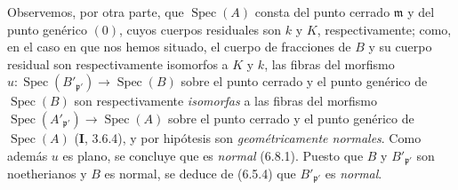 Observemos, por otra parte, que $\operatorname{Spec}(A)$ consta del
punto cerrado $\mathfrak m$ y del punto genérico $(0)$, cuyos cuerpos
residuales son $k$ y $K$, respectivamente; como, en el caso en que nos hemos situado,
el cuerpo de fracciones de $B$ y su cuerpo residual son respectivamente isomorfos a
$K$ y $k$, las fibras del morfismo
$u:\operatorname{Spec}(B'_{\mathfrak p'})\to\operatorname{Spec}(B)$
sobre el punto cerrado y el punto genérico de $\operatorname{Spec}(B)$
son respectivamente \emph{isomorfas} a las fibras del morfismo
$\operatorname{Spec}(A'_{\mathfrak p'})\to\operatorname{Spec}(A)$
sobre el punto cerrado y el punto genérico de $\operatorname{Spec}(A)$
(\textbf{I}, 3.6.4), y por hipótesis son \emph{geométricamente normales}. Como además
$u$ es plano, se concluye que es \emph{normal} (6.8.1). Puesto que $B$ y
$B'_{\mathfrak p'}$ son noetherianos y $B$ es normal, se deduce de
(6.5.4) que $B'_{\mathfrak p'}$ es \emph{normal}.

